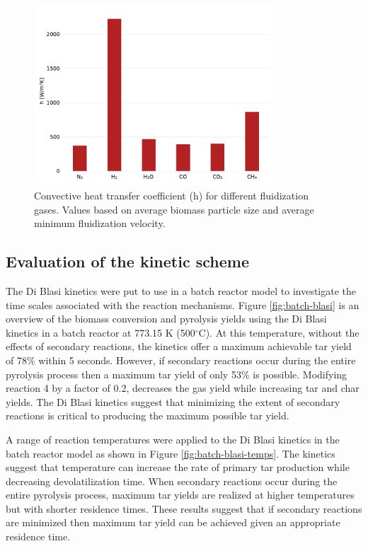 \begin{figure}[H]
    \centering
    \includegraphics[width=0.8\textwidth]{figures/biomass_hconv.pdf}
    \caption{Convective heat transfer coefficient (h) for different fluidization gases. Values based on average biomass particle size and average minimum fluidization velocity.}
    \label{fig:biomass-hconv}
\end{figure}


\subsection{Evaluation of the kinetic scheme}

The Di Blasi kinetics were put to use in a batch reactor model to investigate the time scales associated with the reaction mechanisms. Figure \ref{fig:batch-blasi} is an overview of the biomass conversion and pyrolysis yields using the Di Blasi kinetics in a batch reactor at 773.15 K (500$^\circ$C). At this temperature, without the effects of secondary reactions, the kinetics offer a maximum achievable tar yield of 78\% within 5 seconds. However, if secondary reactions occur during the entire pyrolysis process then a maximum tar yield of only 53\% is possible. Modifying reaction 4 by a factor of 0.2, decreases the gas yield while increasing tar and char yields. The Di Blasi kinetics suggest that minimizing the extent of secondary reactions is critical to producing the maximum possible tar yield.

A range of reaction temperatures were applied to the Di Blasi kinetics in the batch reactor model as shown in Figure \ref{fig:batch-blasi-temps}. The kinetics suggest that temperature can increase the rate of primary tar production while decreasing devolatilization time. When secondary reactions occur during the entire pyrolysis process, maximum tar yields are realized at higher temperatures but with shorter residence times. These results suggest that if secondary reactions are minimized then maximum tar yield can be achieved given an appropriate residence time.

